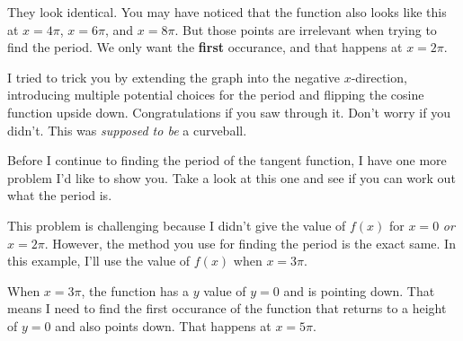 They look identical. You may have noticed that the function also looks like this at $x = 4\pi$, $x = 6\pi$, and $x = 8\pi$. But those points are irrelevant when trying to find the period. We only want the \textbf{first} occurance, and that happens at $x = 2\pi$.

I tried to trick you by extending the graph into the negative $x$-direction, introducing multiple potential choices for the period and flipping the cosine function upside down. Congratulations if you saw through it. Don't worry if you didn't. This was \textit{supposed to be} a curveball.

Before I continue to finding the period of the tangent function, I have one more problem I'd like to show you. Take a look at this one and see if you can work out what the period is.
\begin{center}
\end{center}
This problem is challenging because I didn't give the value of $f(x)$ for $x = 0$ \textit{or} $x = 2\pi$. However, the method you use for finding the period is the exact same. In this example, I'll use the value of $f(x)$ when $x = 3\pi$.

When $x = 3\pi$, the function has a $y$ value of $y = 0$ and is pointing down. That means I need to find the first occurance of the function that returns to a height of $y = 0$ and also points down. That happens at $x = 5\pi$.

